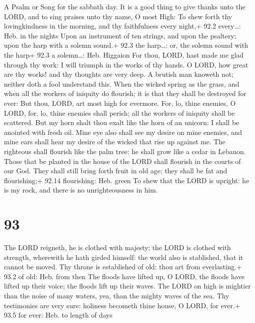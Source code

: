 A Psalm or Song for the sabbath day.  It is a good thing to
give thanks unto the LORD, and to sing praises unto thy name, O most
High:  To shew forth thy lovingkindness in the morning, and
thy faithfulness every night,+ 92.2 every\ldots: Heb. in the nights
 Upon an instrument of ten strings, and upon the psaltery;
upon the harp with a solemn sound.+ 92.3 the harp\ldots: or, the solemn
sound with the harp+ 92.3 a solemn\ldots: Heb. Higgaion  For
thou, LORD, hast made me glad through thy work: I will triumph in the
works of thy hands.  O LORD, how great are thy works! and
thy thoughts are very deep.  A brutish man knoweth not;
neither doth a fool understand this.  When the wicked spring
as the grass, and when all the workers of iniquity do flourish; it is
that they shall be destroyed for ever:  But thou, LORD, art
most high for evermore.  For, lo, thine enemies, O LORD,
for, lo, thine enemies shall perish; all the workers of iniquity shall
be scattered.  But my horn shalt thou exalt like the horn
of an unicorn: I shall be anointed with fresh oil.  Mine
eye also shall see my desire on mine enemies, and mine ears shall hear
my desire of the wicked that rise up against me.  The
righteous shall flourish like the palm tree: he shall grow like a cedar
in Lebanon.  Those that be planted in the house of the LORD
shall flourish in the courts of our God.  They shall still
bring forth fruit in old age; they shall be fat and flourishing;+ 92.14
flourishing: Heb. green  To shew that the LORD is upright:
he is my rock, and there is no unrighteousness in him.

\hypertarget{section-92}{%
\section{93}\label{section-92}}

 The LORD reigneth, he is clothed with majesty; the LORD is
clothed with strength, wherewith he hath girded himself: the world also
is stablished, that it cannot be moved.  Thy throne is
established of old: thou art from everlasting.+ 93.2 of old: Heb. from
then  The floods have lifted up, O LORD, the floods have
lifted up their voice; the floods lift up their waves.  The
LORD on high is mightier than the noise of many waters, yea, than the
mighty waves of the sea.  Thy testimonies are very sure:
holiness becometh thine house, O LORD, for ever.+ 93.5 for ever: Heb. to
length of days

